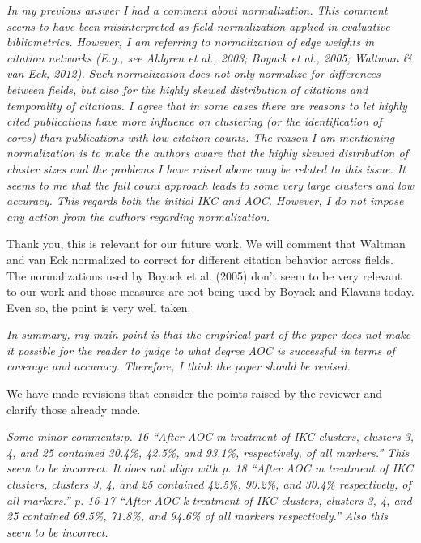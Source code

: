 \documentclass[11pt, oneside]{article}   	%
\begin{document}
\vspace{2 mm} 
 \emph{ In my previous answer I had a comment about normalization. This comment seems to have been misinterpreted as field-normalization applied in evaluative bibliometrics. However, I am referring to normalization of edge weights in citation networks (E.g., see Ahlgren et al., 2003; Boyack et al., 2005; Waltman \& van Eck, 2012). Such normalization does not only normalize for differences between fields, but also for the highly skewed distribution of citations and temporality of citations. I agree that in some cases there are reasons to let highly cited publications have more influence on clustering (or the identification of cores) than publications with low citation counts. The reason I am mentioning normalization is to make the authors aware that the highly skewed distribution of cluster sizes and the problems I have raised above may be related to this issue. It seems to me that the full count approach leads to some very large clusters and low accuracy. This regards both the initial IKC and AOC. However, I do not impose any action from the authors regarding normalization.}
 
 \vspace{2 mm} 
 Thank you, this is relevant for our future work. We will comment that Waltman and van Eck normalized to correct for different citation behavior across fields. The normalizations used by Boyack et al. (2005) don't seem to be very relevant to our work and those measures are not being used by Boyack and Klavans today. Even so, the point is very well taken. 

\vspace{2 mm} 
 \emph{In summary, my main point is that the empirical part of the paper does not make it possible for the reader to judge to what degree AOC is successful in terms of coverage and accuracy. Therefore, I think the paper should be revised.}  
 
 \vspace{2 mm} 
 We have made revisions that consider the points raised by the reviewer and clarify those already made.

\vspace{2 mm} 
 \emph{Some minor comments:p. 16 “After AOC m treatment of IKC clusters, clusters 3, 4, and 25 contained 30.4\%, 42.5\%, and 93.1\%, respectively, of all markers.” This seem to be incorrect. It does not align with p. 18 “After AOC m treatment of IKC clusters, clusters 3, 4, and 25 contained 42.5\%, 90.2\%, and 30.4\% respectively, of all markers.” p. 16-17 “After AOC k treatment of IKC clusters, clusters 3, 4, and 25 contained 69.5\%, 71.8\%, and 94.6\% of all markers respectively.” Also this seem to be incorrect.} \\
\end{document}
